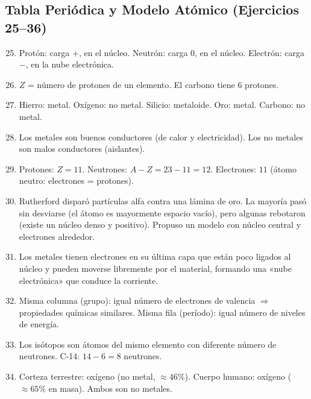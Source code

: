 \documentclass[12pt, letterpaper]{article}
\begin{document}
  \subsection*{Tabla Periódica y Modelo Atómico (Ejercicios 25--36)}

  \begin{enumerate}[leftmargin=*, label=\textbf{\arabic*.}]
    \setcounter{enumi}{24}
    \item Protón: carga $+$, en el núcleo. Neutrón: carga $0$, en el núcleo. Electrón: carga $-$, en la nube electrónica.

    \item $Z$ = número de protones de un elemento. El carbono tiene 6 protones.

    \item Hierro: metal. Oxígeno: no metal. Silicio: metaloide. Oro: metal. Carbono: no metal.

    \item Los metales son buenos conductores (de calor y electricidad). Los no metales son malos conductores (aislantes).

    \item Protones: $Z = 11$. Neutrones: $A - Z = 23 - 11 = 12$. Electrones: $11$ (átomo neutro: electrones = protones).

    \item Rutherford disparó partículas alfa contra una lámina de oro. La mayoría pasó sin desviarse (el átomo es mayormente espacio vacío), pero algunas rebotaron (existe un núcleo denso y positivo). Propuso un modelo con núcleo central y electrones alrededor.

    \item Los metales tienen electrones en su última capa que están poco ligados al núcleo y pueden moverse libremente por el material, formando una «nube electrónica» que conduce la corriente.

    \item Misma columna (grupo): igual número de electrones de valencia $\Rightarrow$ propiedades químicas similares. Misma fila (período): igual número de niveles de energía.

    \item Los isótopos son átomos del mismo elemento con diferente número de neutrones. C-14: $14 - 6 = 8$ neutrones.

    \item Corteza terrestre: oxígeno (no metal, $\approx 46\%$). Cuerpo humano: oxígeno ($\approx 65\%$ en masa). Ambos son no metales.


\end{enumerate}
\end{document}

